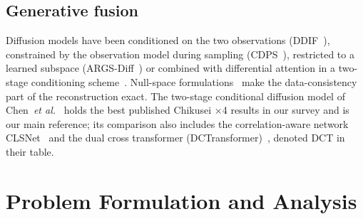 \documentclass[journal]{IEEEtran}
\begin{document}
\subsection{Generative fusion}
Diffusion models have been conditioned on the two observations (DDIF~\cite{cao2024ddif}), constrained by the observation model during sampling (CDPS~\cite{xu2026cdps}), restricted to a learned subspace (ARGS-Diff~\cite{zhu2025argsdiff}) or combined with differential attention in a two-stage conditioning scheme~\cite{chen2026twostage}. Null-space formulations~\cite{wang2023ddnm} make the data-consistency part of the reconstruction exact. The two-stage conditional diffusion model of Chen~\textit{et al.}~\cite{chen2026twostage} holds the best published Chikusei $\times$4 results in our survey and is our main reference; its comparison also includes the correlation-aware network CLSNet~\cite{yang2026clsnet} and the dual cross transformer (DCTransformer)~\cite{ma2024reciprocal}, denoted DCT in their table.

\section{Problem Formulation and Analysis}
\label{sec:model}
\end{document}
